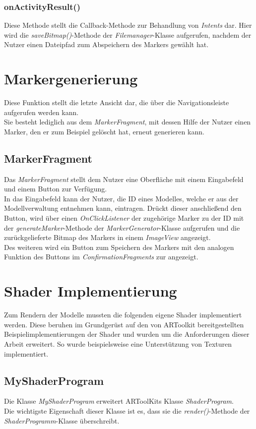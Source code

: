 \subsubsection{onActivityResult()}
Diese Methode stellt die Callback-Methode zur Behandlung von \textit{Intents} dar. Hier wird die \textit{saveBitmap()}-Methode der \textit{Filemanager}-Klasse aufgerufen, nachdem der Nutzer einen Dateipfad zum Abspeichern des Markers gewählt hat.


\section{Markergenerierung}\label{impl:generator}
Diese Funktion stellt die letzte Ansicht dar, die über die Navigationsleiste aufgerufen werden kann.\\
Sie besteht lediglich aus dem \textit{MarkerFragment}, mit dessen Hilfe der Nutzer einen Marker, den er zum Beispiel gelöscht hat, erneut generieren kann.

\subsection{MarkerFragment}
Das \textit{MarkerFragment} stellt dem Nutzer eine Oberfläche mit einem Eingabefeld und einem Button zur Verfügung.\\
In das Eingabefeld kann der Nutzer, die ID eines Modelles, welche er aus der Modellverwaltung entnehmen kann, eintragen. Drückt dieser anschließend den Button, wird über einen \textit{OnClickListener} der zugehörige Marker zu der ID mit der \textit{generateMarker}-Methode der \textit{MarkerGenerator}-Klasse aufgerufen und die zurückgelieferte Bitmap des Markers in einem \textit{ImageView} angezeigt. \\
Des weiteren wird ein Button zum Speichern des Markers mit den analogen Funktion des Buttons im \textit{ConfirmationFragments} zur angezeigt.


\section{Shader Implementierung}
Zum Rendern der Modelle mussten die folgenden eigene Shader implementiert werden. Diese beruhen im Grundgerüst auf den von ARToolkit bereitgestellten Beispielimplementierungen der Shader und wurden um die Anforderungen dieser Arbeit erweitert. So wurde beispielsweise eine Unterstützung von Texturen implementiert.

\subsection{MyShaderProgram}
Die Klasse \textit{MyShaderProgram} erweitert ARToolKits Klasse \textit{ShaderProgram}. \\
Die wichtigste Eigenschaft dieser Klasse ist es, dass sie die \textit{render()}-Methode der \textit{ShaderProgramm}-Klasse überschreibt.

